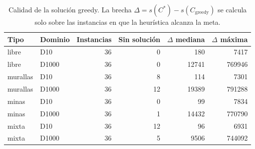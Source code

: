 \begin{table}[H]
\centering
\small
\begin{tabular}{llrrrr}
\hline
Tipo & Dominio & Instancias & Sin solución & $\Delta$ mediana & $\Delta$ máxima \\
\hline
libre & D10 & 36 & 0 & 180 & 7417 \\
libre & D1000 & 36 & 0 & 12741 & 769946 \\
murallas & D10 & 36 & 8 & 114 & 7301 \\
murallas & D1000 & 36 & 12 & 19389 & 791288 \\
minas & D10 & 36 & 0 & 99 & 7834 \\
minas & D1000 & 36 & 1 & 14432 & 770790 \\
mixta & D10 & 36 & 12 & 96 & 6931 \\
mixta & D1000 & 36 & 5 & 9506 & 744092 \\
\hline
\end{tabular}
\caption{Calidad de la solución greedy. La brecha $\Delta = s(C^*) - s(C_{\text{greedy}})$ se calcula solo sobre las instancias en que la heurística alcanza la meta.}
\label{tab:grid_calidad}
\end{table}

